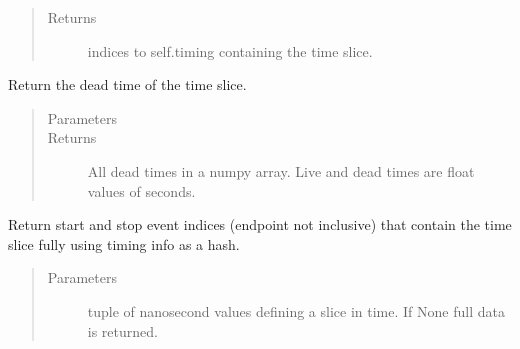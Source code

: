 \documentclass[letterpaper,10pt,english]{sphinxmanual}
\begin{document}
\begin{fulllineitems}
\begin{fulllineitems}
\begin{quote}
\begin{description}
\item[{Returns}] \leavevmode
\sphinxAtStartPar
indices to self.timing containing the time slice.

\end{description}\end{quote}

\end{fulllineitems}


\begin{fulllineitems}
\label{\detokenize{autodocs/data:listmode.data.TimeCache.get_dead_time}}
\sphinxAtStartPar
Return the dead time of the time slice.
\begin{quote}\begin{description}
\item[{Parameters}] \leavevmode
\sphinxAtStartPar
{} \textendash{} 

\item[{Returns}] \leavevmode
\sphinxAtStartPar
All dead times in a numpy array. Live and dead times are float values of seconds.

\end{description}\end{quote}

\end{fulllineitems}


\begin{fulllineitems}
\label{\detokenize{autodocs/data:listmode.data.TimeCache.get_indices}}
\sphinxAtStartPar
Return start and stop event indices (endpoint not inclusive) that contain the time slice fully using timing
info as a hash.
\begin{quote}\begin{description}
\item[{Parameters}] \leavevmode
\sphinxAtStartPar
{} \textendash{} tuple of nanosecond values defining a slice in time. If None full data is returned.


\end{description}
\end{quote}
\end{fulllineitems}
\end{fulllineitems}
\end{document}
